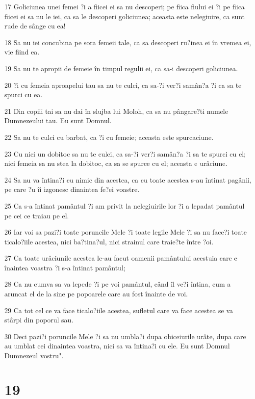 \par 17 Goliciunea unei femei ?i a fiicei ei sa nu descoperi; pe fiica fiului ei ?i pe fiica fiicei ei sa nu le iei, ca sa le descoperi goliciunea; aceasta este nelegiuire, ca sunt rude de sânge cu ea!
\par 18 Sa nu iei concubina pe sora femeii tale, ca sa descoperi ru?inea ei în vremea ei, vie fiind ea.
\par 19 Sa nu te apropii de femeie în timpul regulii ei, ca sa-i descoperi goliciunea.
\par 20 ?i cu femeia aproapelui tau sa nu te culci, ca sa-?i ver?i samân?a ?i ca sa te spurci cu ea.
\par 21 Din copiii tai sa nu dai în slujba lui Moloh, ca sa nu pângare?ti numele Dumnezeului tau. Eu sunt Domnul.
\par 22 Sa nu te culci cu barbat, ca ?i cu femeie; aceasta este spurcaciune.
\par 23 Cu nici un dobitoc sa nu te culci, ca sa-?i ver?i samân?a ?i sa te spurci cu el; nici femeia sa nu stea la dobitoc, ca sa se spurce cu el; aceasta e urâciune.
\par 24 Sa nu va întina?i cu nimic din acestea, ca cu toate acestea s-au întinat pagânii, pe care ?u îi izgonesc dinaintea fe?ei voastre.
\par 25 Ca s-a întinat pamântul ?i am privit la nelegiuirile lor ?i a lepadat pamântul pe cei ce traiau pe el.
\par 26 Iar voi sa pazi?i toate poruncile Mele ?i toate legile Mele ?i sa nu face?i toate ticalo?iile acestea, nici ba?tina?ul, nici strainul care traie?te între ?oi.
\par 27 Ca toate urâciunile acestea le-au facut oamenii pamântului acestuia care e înaintea voastra ?i s-a întinat pamântul;
\par 28 Ca nu cumva sa va lepede ?i pe voi pamântul, când îl ve?i întina, cum a aruncat el de la sine pe popoarele care au fost înainte de voi.
\par 29 Ca tot cel ce va face ticalo?iile acestea, sufletul care va face acestea se va stârpi din poporul sau.
\par 30 Deci pazi?i poruncile Mele ?i sa nu umbla?i dupa obiceiurile urâte, dupa care au umblat cei dinaintea voastra, nici sa va întina?i cu ele. Eu sunt Domnul Dumnezeul vostru".

\chapter{19}

